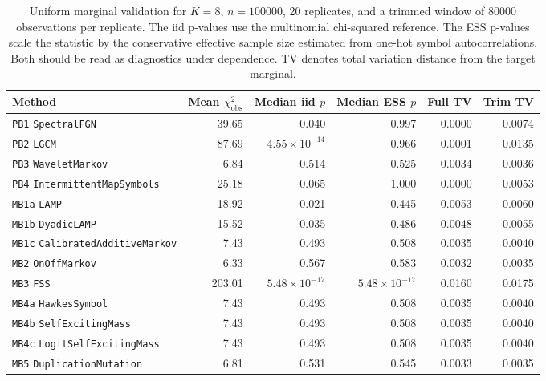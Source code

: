 \documentclass[journal]{IEEEtran}
\newcommand{\code}[1]{\texttt{#1}}
\begin{document}
\begin{table}[!t]
\caption{Uniform marginal validation for \(K=8\), \(n=100000\), 20 replicates,
and a trimmed window of 80000 observations per replicate. The iid p-values use
the multinomial chi-squared reference. The ESS p-values scale the statistic by
the conservative effective sample size estimated from one-hot symbol
autocorrelations. Both should be read as diagnostics under dependence. TV
denotes total variation distance from the target marginal.}
\label{tab:uniform-marginal}
\centering
\footnotesize
\begin{tabular}{lrrrrr}
\hline
Method & Mean \(\chi^2_{\mathrm{obs}}\) & Median iid \(p\) & Median ESS \(p\) & Full TV & Trim TV \\
\hline
\code{PB1} \code{SpectralFGN} & 39.65 & 0.040 & 0.997 & 0.0000 & 0.0074 \\
\code{PB2} \code{LGCM} & 87.69 & \(4.55{\times}10^{-14}\) & 0.966 & 0.0001 & 0.0135 \\
\code{PB3} \code{WaveletMarkov} & 6.84 & 0.514 & 0.525 & 0.0034 & 0.0036 \\
\code{PB4} \code{IntermittentMapSymbols} & 25.18 & 0.065 & 1.000 & 0.0000 & 0.0053 \\
\code{MB1a} \code{LAMP} & 18.92 & 0.021 & 0.445 & 0.0053 & 0.0060 \\
\code{MB1b} \code{DyadicLAMP} & 15.52 & 0.035 & 0.486 & 0.0048 & 0.0055 \\
\code{MB1c} \code{CalibratedAdditiveMarkov} & 7.43 & 0.493 & 0.508 & 0.0035 & 0.0040 \\
\code{MB2} \code{OnOffMarkov} & 6.33 & 0.567 & 0.583 & 0.0032 & 0.0035 \\
\code{MB3} \code{FSS} & 203.01 & \(5.48{\times}10^{-17}\) & \(5.48{\times}10^{-17}\) & 0.0160 & 0.0175 \\
\code{MB4a} \code{HawkesSymbol} & 7.43 & 0.493 & 0.508 & 0.0035 & 0.0040 \\
\code{MB4b} \code{SelfExcitingMass} & 7.43 & 0.493 & 0.508 & 0.0035 & 0.0040 \\
\code{MB4c} \code{LogitSelfExcitingMass} & 7.43 & 0.493 & 0.508 & 0.0035 & 0.0040 \\
\code{MB5} \code{DuplicationMutation} & 6.81 & 0.531 & 0.545 & 0.0033 & 0.0035 \\
\hline
\end{tabular}
\end{table}
\end{document}
